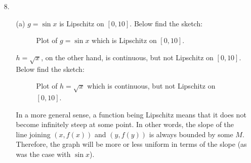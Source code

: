 \documentclass[11pt]{article}
\begin{document}
\begin{itemize}
    \item[8.]
        \begin{itemize}
            \item[(a)]
                $g = \sin{x}$ is Lipschitz on $[0, 10]$. Below find the sketch:

                \begin{figure}[H]
                    \centering
                    \caption{Plot of $g = \sin{x}$ which is Lipschitz on $[0, 10]$.}
                \end{figure}

                $h = \sqrt{x}$, on the other hand, is continuous, but not
                Lipschitz on $[0, 10]$. Below find the sketch:

                \begin{figure}[H]
                    \centering
                    \caption{Plot of $h = \sqrt{x}$ which is continuous, but
                    not Lipschitz on $[0, 10]$.}
                \end{figure}

                In a more general sense, a function being Lipschitz means that
                it does not become infinitely steep at some point. In other
                words, the slope of the line joining $(x, f(x))$ and $(y,
                f(y))$ is always bounded by some $M$. Therefore, the graph will
                be more or less uniform in terms of the slope (as was the case
                with $\sin{x}$).


\end{itemize}
\end{itemize}
\end{document}
